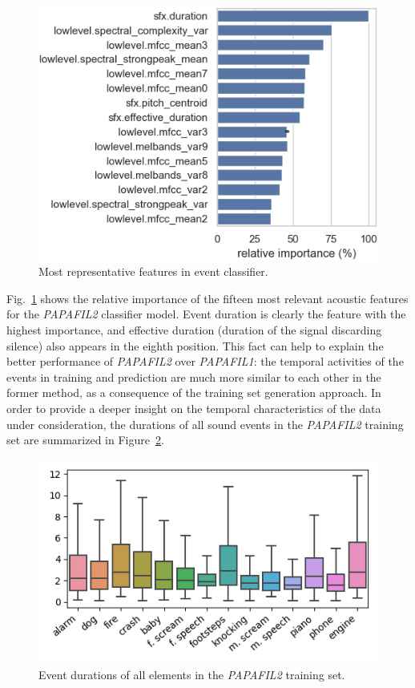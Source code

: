 \begin{figure}[t]
  \centering
  \centerline{\includegraphics[width=\columnwidth]{Figures/SELD/importance_new_tight.png}}
  \caption{Most representative features in event classifier.}
  \label{fig:importance}
\end{figure}

Fig.~\ref{fig:importance} shows the relative importance of the fifteen most relevant acoustic features for the \textit{PAPAFIL2} classifier model.
Event duration is clearly the feature with the highest importance, and effective duration (duration of the signal discarding silence) also appears in the eighth position.
This fact can help to explain the better performance of \textit{PAPAFIL2} over \textit{PAPAFIL1}: the temporal activities of the events in training and prediction are much more similar to each other in the former method, as a consequence of the training set generation approach. 
In order to provide a deeper insight on the temporal characteristics of the data under consideration, the durations of all sound events in the \textit{PAPAFIL2} training set are summarized in Figure~\ref{fig:eventdurations}. \\

\begin{figure}[t]
  \centering
  \centerline{\includegraphics[width=\columnwidth]{Figures/SELD/event_durations.png}}
  \caption{Event durations of all elements in the \textit{PAPAFIL2} training set.}
  \label{fig:eventdurations}
\end{figure}



